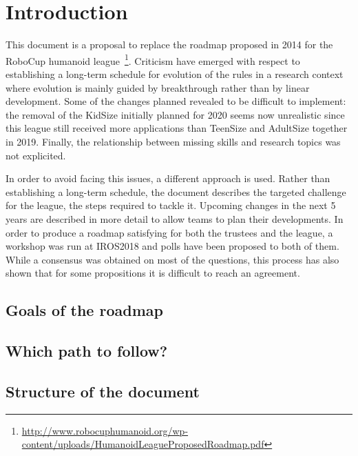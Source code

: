 \documentclass{article}
\begin{document}
\section{Introduction}

This document is a proposal to replace the roadmap proposed in 2014 for the
RoboCup humanoid
league~\footnote{\url{http://www.robocuphumanoid.org/wp-content/uploads/HumanoidLeagueProposedRoadmap.pdf}}. Criticism
have emerged with respect to establishing a long-term schedule for evolution of
the rules in a research context where evolution is mainly guided by breakthrough
rather than by linear development. Some of the changes planned revealed to be
difficult to implement: the removal of the KidSize initially planned for 2020
seems now unrealistic since this league still received more applications than
TeenSize and AdultSize together in 2019. Finally, the relationship between
missing skills and research topics was not explicited.

In order to avoid facing this issues, a different approach is used. Rather than
establishing a long-term schedule, the document describes the targeted challenge
for the league, the steps required to tackle it. Upcoming changes in the next 5
years are described in more detail to allow teams to plan their developments. In
order to produce a roadmap satisfying for both the trustees and the league, a
workshop was run at IROS2018 and polls have been proposed to both of them. While
a consensus was obtained on most of the questions, this process has also shown
that for some propositions it is difficult to reach an agreement.

\subsection{Goals of the roadmap}

\subsection{Which path to follow?}

\subsection{Structure of the document}
\end{document}
